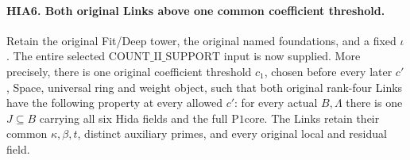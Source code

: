 \paragraph{HIA6. Both original Links above one common coefficient threshold.}
\label{claim:HIA6}
Retain the original Fit/Deep tower, the original named
foundations, and a fixed \(\iota\).  The entire selected
\(\mathrm{COUNT\_II\_SUPPORT}\) input is now supplied.
More precisely, there is one original coefficient threshold
\(c_1\), chosen before every later \(c'\), Space,
universal ring and weight object, such that both original
rank-four Links have the following property at every
allowed \(c'\): for every actual \(B,\Lambda\) there
is one \(J\subseteq B\) carrying all six Hida fields
and the full \(\mathrm{P1core}\).  The Links retain
their common \(\kappa,\beta,t\), distinct auxiliary
primes, and every original local and residual field.
